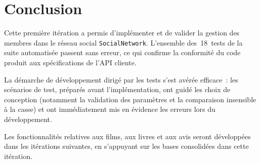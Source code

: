 \documentclass[12pt,a4paper]{article}
\begin{document}
\section{Conclusion}

Cette première itération a permis d'implémenter et de valider la gestion des membres dans le
réseau social \texttt{SocialNetwork}.  L'ensemble des~18~tests de la suite automatisée passent
sans erreur, ce qui confirme la conformité du code produit aux spécifications de l'API cliente.

La démarche de développement dirigé par les tests s'est avérée efficace~: les scénarios de test,
préparés avant l'implémentation, ont guidé les choix de conception (notamment la validation des
paramètres et la comparaison insensible à la casse) et ont immédiatement mis en évidence les
erreurs lors du développement.

Les fonctionnalités relatives aux films, aux livres et aux avis seront développées dans les
itérations suivantes, en s'appuyant sur les bases consolidées dans cette itération.
\end{document}
